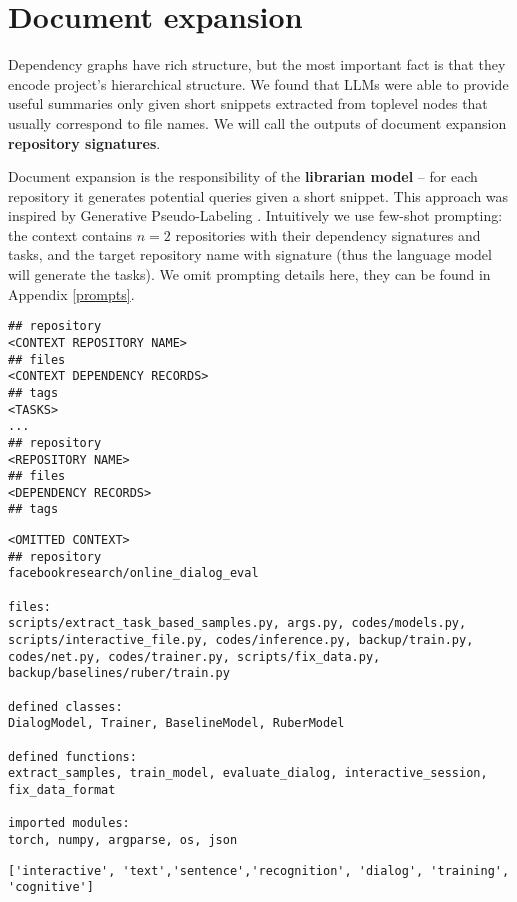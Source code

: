 \section{Document expansion}
\label{approach_document_expansion}
Dependency graphs have rich structure, but the most important fact is that they encode project's hierarchical structure. We found that LLMs were able to provide useful summaries only given short snippets extracted from toplevel nodes that usually correspond to file names. We will call the outputs of document expansion \textbf{repository signatures}.

Document expansion is the responsibility of the \textbf{librarian model} -- for each repository it generates potential queries given a short snippet. This approach was inspired by Generative Pseudo-Labeling \cite{gpl}. Intuitively we use few-shot prompting: the context contains $n=2$ repositories with their dependency signatures and tasks, and the target repository name with signature (thus the language model will generate the tasks). We omit prompting details here, they can be found in Appendix \ref{prompts}.

\begin{samepage}
\begin{lstlisting}[caption=Few-shot prompt format]
## repository
<CONTEXT REPOSITORY NAME>
## files
<CONTEXT DEPENDENCY RECORDS>
## tags
<TASKS>
...
## repository
<REPOSITORY NAME>
## files
<DEPENDENCY RECORDS>
## tags
\end{lstlisting}
\end{samepage}

\begin{samepage}
\begin{lstlisting}[caption=Input repository]
<OMITTED CONTEXT>
## repository
facebookresearch/online_dialog_eval

files:
scripts/extract_task_based_samples.py, args.py, codes/models.py, scripts/interactive_file.py, codes/inference.py, backup/train.py, codes/net.py, codes/trainer.py, scripts/fix_data.py, backup/baselines/ruber/train.py

defined classes:
DialogModel, Trainer, BaselineModel, RuberModel

defined functions:
extract_samples, train_model, evaluate_dialog, interactive_session, fix_data_format

imported modules:
torch, numpy, argparse, os, json
\end{lstlisting}
\end{samepage}


\begin{samepage}
\begin{lstlisting}[caption=Generated text]
['interactive', 'text','sentence','recognition', 'dialog', 'training', 'cognitive']
\end{lstlisting}
\end{samepage}
